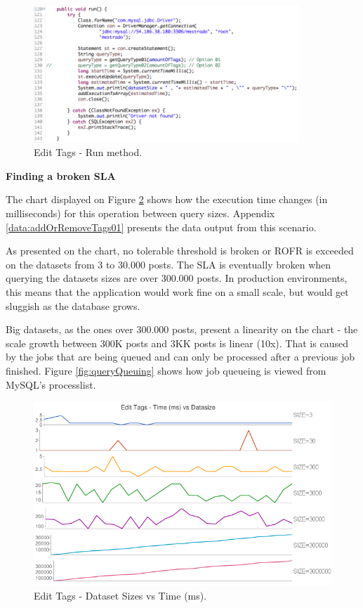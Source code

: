 \begin{figure}[ht!]
\centering
\includegraphics[width=100mm]{Imagens/tags-java-02.png}
\caption{Edit Tags - Run method.\label{fig:tags-java-02}}
\end{figure}

\noindent \textbf{Finding a broken SLA}

The chart displayed on Figure \ref{fig:tags-scenairo-02-chart} shows how the execution time changes (in milliseconds) for this operation between query sizes. Appendix \ref{data:addOrRemoveTags01} presents the data output from this scenario.  

As presented on the chart, no tolerable threshold is broken or ROFR is exceeded on the datasets from 3 to 30.000 posts. The SLA is eventually broken when querying the datasets sizes are over 300.000 posts. In production environments, this means that the application would work fine on a small scale, but would get sluggish as the database grows.

Big datasets, as the ones over 300.000 posts, present a linearity on the chart - the scale growth between 300K posts and 3KK posts is linear (10x). That is caused by the jobs that are being queued and can only be processed after a previous job finished. Figure \ref{fig:queryQueuing} shows how job queueing is viewed from MySQL's processlist.  

\begin{figure}[ht!]
\centering
\includegraphics[width=150mm]{Imagens/second-scenario.png}
\caption{Edit Tags - Dataset Sizes vs Time (ms).\label{fig:tags-scenairo-02-chart}}
\end{figure}

